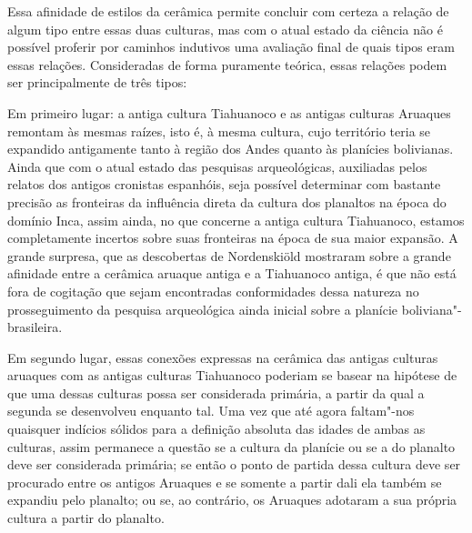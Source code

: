 Essa afinidade de estilos da cerâmica permite concluir com certeza a
relação de algum tipo entre essas duas culturas, mas com o atual estado
da ciência não é possível proferir por caminhos indutivos uma avaliação
final de quais tipos eram essas relações. Consideradas de forma
puramente teórica, essas relações podem ser principalmente de três
tipos:

Em primeiro lugar: a antiga cultura Tiahuanoco e as antigas culturas
Aruaques remontam às mesmas raízes, isto é, à mesma cultura, cujo
território teria se expandido antigamente tanto à região dos Andes
quanto às planícies bolivianas. Ainda que com o atual estado das
pesquisas arqueológicas, auxiliadas pelos relatos dos antigos cronistas
espanhóis, seja possível determinar com bastante precisão as fronteiras
da influência direta da cultura dos planaltos na época do domínio Inca,
assim ainda, no que concerne a antiga cultura Tiahuanoco, estamos
completamente incertos sobre suas fronteiras na época de sua maior
expansão. A grande surpresa, que as descobertas de Nordenskiöld
mostraram sobre a grande afinidade entre a cerâmica aruaque antiga e a
Tiahuanoco antiga, é que não está fora de cogitação que sejam
encontradas conformidades dessa natureza no prosseguimento da pesquisa
arqueológica ainda inicial sobre a planície boliviana"-brasileira.

Em segundo lugar, essas conexões expressas na cerâmica das antigas
culturas aruaques com as antigas culturas Tiahuanoco poderiam se basear
na hipótese de que uma dessas culturas possa ser considerada primária,
a partir da qual a segunda se desenvolveu enquanto tal. Uma vez que até
agora faltam"-nos quaisquer indícios sólidos para a definição absoluta
das idades de ambas as culturas, assim permanece a questão se a cultura
da planície ou se a do planalto deve ser considerada primária; se então
o ponto de partida dessa cultura deve ser procurado entre os antigos
Aruaques e se somente a partir dali ela também se expandiu pelo planalto;
ou se, ao contrário, os Aruaques adotaram a sua própria cultura a partir
do planalto.

